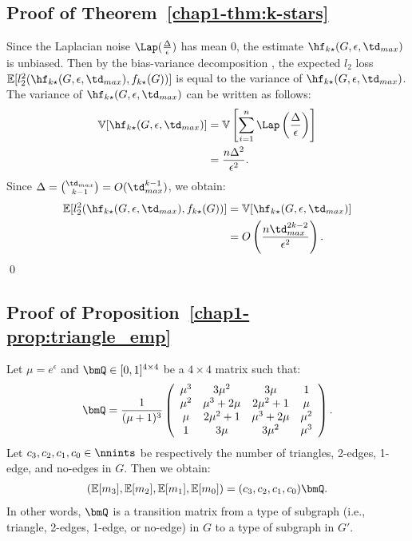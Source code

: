 \subsection{Proof of Theorem~\ref{chap1-thm:k-stars}}
Since the Laplacian noise $\Lap(\frac{\Delta}{\epsilon})$ has mean $0$, the estimate $\hf_{k\star}(G, \epsilon, \td_{max})$ is unbiased. 
Then by the bias-variance decomposition \cite{mlpp}, 
the expected $l_2$ loss 
$\mathbb{E}[l_2^2(\hf_{k\star}(G, \epsilon, \td_{max}),\allowbreak f_{k\star}(G))]$ is equal to the variance of $\hf_{k\star}(G, \epsilon, \td_{max})$. 
The variance of $\hf_{k\star}(G, \epsilon, \td_{max})$ can be written as follows:
\begin{align*}
    \mathbb{V}[\hf_{k\star}(G, \epsilon, \td_{max})] 
    &= \mathbb{V}\left[ \sum_{i=1}^n \Lap\left( \frac{\Delta}{\epsilon} \right) \right] \\
    &= \frac{n \Delta^2}{\epsilon^2}.
\end{align*}
Since $\Delta = \binom{\td_{max}}{k-1} = O(\td_{max}^{k-1})$, we obtain:
\begin{align*}
    \mathbb{E}[l_2^2(\hf_{k\star}(G, \epsilon, \td_{max}), f_{k\star}(G))] 
    &= \mathbb{V}[\hf_{k\star}(G, \epsilon, \td_{max})] \\
    &= O\left(\frac{n \td_{max}^{2k-2}}{\epsilon^2}\right).
\end{align*}
\qed

\subsection{Proof of Proposition~\ref{chap1-prop:triangle_emp}}
Let $\mu = e^\epsilon$ and $\bmQ \in [0,1]^{4 \times 4}$ be a $4 \times 4$ matrix such that:
\begin{align}
  \bmQ = \frac{1}{(\mu+1)^3} \left(
    \begin{array}{cccc}
      \mu^3 & 3\mu^2 & 3\mu & 1 \\
      \mu^2 & \mu^3+2\mu & 2\mu^2+1 & \mu \\
      \mu & 2\mu^2+1 & \mu^3+2\mu & \mu^2 \\
      1 & 3\mu & 3\mu^2 & \mu^3
    \end{array}
  \right).
  \label{chap1-eq:Q_1}
\end{align}
Let $c_3, c_2, c_1, c_0 \in \nnints$ be respectively the number of triangles, 2-edges, 1-edge, and no-edges in $G$. 
Then we obtain:
\begin{align}
(\mathbb{E}[m_3], \mathbb{E}[m_2], \mathbb{E}[m_1],
\mathbb{E}[m_0]) = (c_3, c_2, c_1, c_0) \bmQ.
\label{chap1-eq:bmQ}
\end{align}
In other words, $\bmQ$ is a transition matrix from a type of subgraph (i.e., triangle, 2-edges, 1-edge, or no-edge) in $G$ to a type of subgraph in $G'$. 

